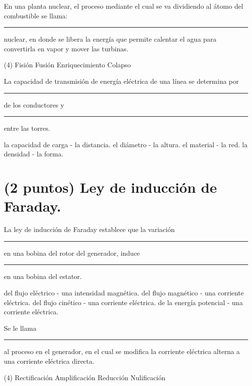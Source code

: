 \documentclass[12pt, letter]{exam}
\begin{document}
\begin{questions}
    \question En una planta nuclear, el proceso mediante el cual se va dividiendo al átomo del combustible se llama: \rule{2cm}{0.1mm} nuclear, en donde se libera la energía que permite calentar el agua para convertirla en vapor y mover las turbinas.
    \begin{tasks}(4)
        \task Fisión
        \task Fusión
        \task Enriquecimiento
        \task Colapso
    \end{tasks}

    \newpage

    \question La capacidad de transmisión de energía eléctrica de una línea se determina por \rule{2cm}{0.1mm} de los conductores y \rule{2cm}{0.1mm} entre las torres.
    \begin{multicols}{2}
    \begin{tasks}
        \task la capacidad de carga - la distancia.
        \task el diámetro - la altura.
        \task el material - la red.
        \task la densidad - la forma.
    \end{tasks}
    \end{multicols}

    \section{(2 puntos) Ley de inducción de Faraday.}

    \question La ley de inducción de Faraday establece que la variación \rule{2cm}{0.1mm} en una bobina del rotor del generador, induce \rule{2cm}{0.1mm} en una bobina del estator.
    \begin{tasks}
        \task del flujo eléctrico - una intensidad magnética.
        \task del flujo magnético - una corriente eléctrica.
        \task del flujo cinético - una corriente eléctrica.
        \task de la energía potencial - una corriente eléctrica.
    \end{tasks}
    \question Se le llama \rule{2cm}{0.1mm} al proceso en el generador, en el cual se modifica la corriente eléctrica alterna a una corriente eléctrica directa.
    \begin{tasks}(4)
        \task Rectificación
        \task Amplificación
        \task Reducción
        \task Nulificación
    \end{tasks}


\end{questions}
\end{document}
